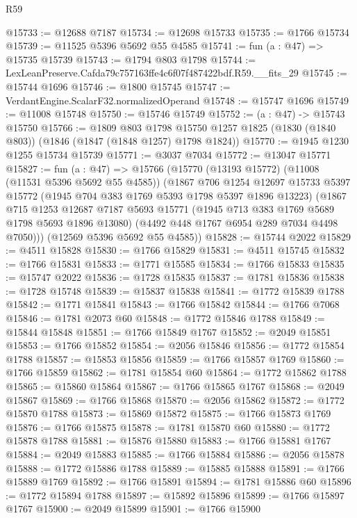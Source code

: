 \begin{lexlean}{R59}
\begin{coremodule}
@15733 := @12688 @7187
@15734 := @12698 @15733
@15735 := @1766 @15734
@15739 := @11525 @5396 @5692 @55 @4585
@15741 := fun (a : @47) => @15735 @15739
@15743 := @1794 @803 @1798
@15744 := LexLeanPreserve.Cafda79c757163ffe4c6f07f487422bdf.R59.__fits_29
@15745 := @15744 @1696
@15746 := @1800 @15745
@15747 := VerdantEngine.ScalarF32.normalizedOperand
@15748 := @15747 @1696
@15749 := @11008 @15748
@15750 := @15746 @15749
@15752 := (a : @47) -> @15743 @15750
@15766 := @1809
    @803
    @1798
    @15750
    @1257
    @1825
    (@1830 (@1840 @803))
    (@1846 (@1847 (@1848 @1257) @1798 @1824))
@15770 := @1945 @1230 @1255 @15734 @15739
@15771 := @3037 @7034
@15772 := @13047 @15771
@15827 := fun (a : @47) =>
  @15766
    (@15770
      (@13193 @15772)
      (@11008 (@11531 @5396 @5692 @55 @4585))
      (@1867
        @706
        @1254
        @12697
        @15733
        @5397
        @15772
        (@1945 @704 @383 @1769 @5393 @1798 @5397 @1896 @13223)
        (@1867
          @715
          @1253
          @12687
          @7187
          @5693
          @15771
          (@1945 @713 @383 @1769 @5689 @1798 @5693 @1896 @13080)
          (@4492 @448 @1767 @6954 @289 @7034 @4498 @7050)))
      (@12569 @5396 @5692 @55 @4585))
@15828 := @15744 @2022
@15829 := @4511 @15828
@15830 := @1766 @15829
@15831 := @4511 @15745
@15832 := @1766 @15831
@15833 := @1771 @15585
@15834 := @1766 @15833
@15835 := @15747 @2022
@15836 := @1728 @15835
@15837 := @1781 @15836
@15838 := @1728 @15748
@15839 := @15837 @15838
@15841 := @1772 @15839 @1788
@15842 := @1771 @15841
@15843 := @1766 @15842
@15844 := @1766 @7068
@15846 := @1781 @2073 @60
@15848 := @1772 @15846 @1788
@15849 := @15844 @15848
@15851 := @1766 @15849 @1767
@15852 := @2049 @15851
@15853 := @1766 @15852
@15854 := @2056 @15846
@15856 := @1772 @15854 @1788
@15857 := @15853 @15856
@15859 := @1766 @15857 @1769
@15860 := @1766 @15859
@15862 := @1781 @15854 @60
@15864 := @1772 @15862 @1788
@15865 := @15860 @15864
@15867 := @1766 @15865 @1767
@15868 := @2049 @15867
@15869 := @1766 @15868
@15870 := @2056 @15862
@15872 := @1772 @15870 @1788
@15873 := @15869 @15872
@15875 := @1766 @15873 @1769
@15876 := @1766 @15875
@15878 := @1781 @15870 @60
@15880 := @1772 @15878 @1788
@15881 := @15876 @15880
@15883 := @1766 @15881 @1767
@15884 := @2049 @15883
@15885 := @1766 @15884
@15886 := @2056 @15878
@15888 := @1772 @15886 @1788
@15889 := @15885 @15888
@15891 := @1766 @15889 @1769
@15892 := @1766 @15891
@15894 := @1781 @15886 @60
@15896 := @1772 @15894 @1788
@15897 := @15892 @15896
@15899 := @1766 @15897 @1767
@15900 := @2049 @15899
@15901 := @1766 @15900

\end{coremodule}
\end{lexlean}
